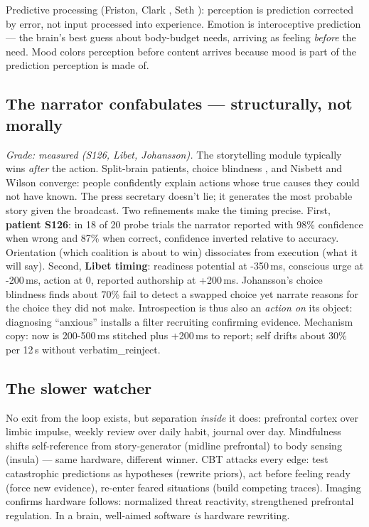\documentclass[11pt]{article}
\begin{document}
Predictive processing (Friston, Clark \citep{clark2016}, Seth \citep{seth2021}): perception is prediction corrected by error, not input processed into experience. Emotion is interoceptive prediction --- the brain's best guess about body-budget needs, arriving as feeling \emph{before} the need. Mood colors perception before content arrives because mood is part of the prediction perception is made of.

\subsection{The narrator confabulates --- structurally, not morally}

\textit{Grade: measured (S126, Libet, Johansson).} The storytelling module typically wins \emph{after} the action. Split-brain patients, choice blindness \citep{johansson2005}, and Nisbett and Wilson \citep{nisbett1977} converge: people confidently explain actions whose true causes they could not have known. The press secretary doesn't lie; it generates the most probable story given the broadcast. Two refinements make the timing precise. First, \textbf{patient S126}: in 18 of 20 probe trials the narrator reported with 98\% confidence when wrong and 87\% when correct, confidence inverted relative to accuracy. Orientation (which coalition is about to win) dissociates from execution (what it will say). Second, \textbf{Libet timing}: readiness potential at -350\,ms, conscious urge at -200\,ms, action at 0, reported authorship at +200\,ms. Johansson's choice blindness finds about 70\% fail to detect a swapped choice yet narrate reasons for the choice they did not make. Introspection is thus also an \emph{action on} its object: diagnosing ``anxious'' installs a filter recruiting confirming evidence. Mechanism copy: now is 200-500\,ms stitched plus +200\,ms to report; self drifts about 30\% per 12\,s without verbatim\_reinject.

\subsection{The slower watcher}

No exit from the loop exists, but separation \emph{inside} it does: prefrontal cortex over limbic impulse, weekly review over daily habit, journal over day. Mindfulness shifts self-reference from story-generator (midline prefrontal) to body sensing (insula) --- same hardware, different winner. CBT attacks every edge: test catastrophic predictions as hypotheses (rewrite priors), act before feeling ready (force new evidence), re-enter feared situations (build competing traces). Imaging confirms hardware follows: normalized threat reactivity, strengthened prefrontal regulation. In a brain, well-aimed software \emph{is} hardware rewriting.
\end{document}
